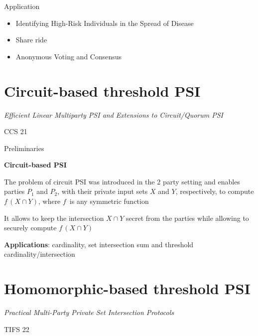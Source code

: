 \begin{frame}{Application}
    
    \begin{itemize}
        \item Identifying High-Risk Individuals in the Spread of Disease
        \item Share ride
        \item Anonymous Voting and Consensus
    \end{itemize}


\end{frame}


\section{Circuit-based threshold PSI}
\begin{frame}
    \centering \textit{Efficient Linear Multiparty PSI and Extensions to Circuit/Quorum PSI}

    \vspace{1cm}
    CCS 21
\end{frame}

\begin{frame}{Preliminaries}

    \textbf{Circuit-based PSI}
    
    \vspace{0.5cm}

    The problem of circuit PSI was introduced in the
    2 party setting and enables parties $P_1$ and $P_2$, with their private input sets $X$ and $Y$, respectively, to compute $f \, (X \cap Y)$, where $f \,$
    is any symmetric function 
    
    \vspace{0.25cm}

    It allows to keep the
    intersection $X \cap Y$ secret from the parties while allowing to securely compute $f \, (X \cap Y)$ 

    \vspace{0.5cm}

    \textbf{Applications}: cardinality, set intersection sum and
    threshold cardinality/intersection

\end{frame}




\section{Homomorphic-based threshold PSI}
\begin{frame}
    \centering \textit{Practical Multi-Party Private Set
    Intersection Protocols}

    \vspace{1cm}
    TIFS 22
\end{frame}

